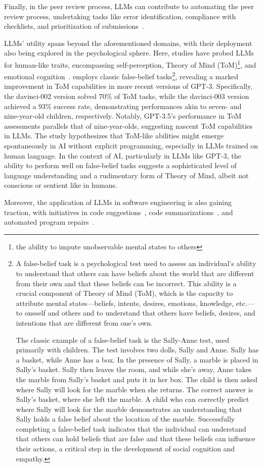 Finally, in the peer review process, LLMs can contribute to automating the peer review process, undertaking tasks like error identification, compliance with checklists, and prioritization of submissions~\cite{liu2023reviewergpt}.

LLMs' utility spans beyond the aforementioned domains, with their deployment also being explored in the psychological sphere.
Here, studies have probed LLMs for human-like traits, encompassing self-perception, Theory of Mind (ToM)\footnote{the ability to impute unobservable mental states to others}, and emotional cognition~\cite{kosinski2023theoryofmind, amin2023affectivecomputing}.
\textcite{kosinski2023theoryofmind} employs classic false-belief tasks\footnote{A false-belief task is a psychological test used to assess an individual's ability to understand that others can have beliefs about the world that are different from their own and that these beliefs can be incorrect. This ability is a crucial component of Theory of Mind (ToM), which is the capacity to attribute mental states—beliefs, intents, desires, emotions, knowledge, etc.—to oneself and others and to understand that others have beliefs, desires, and intentions that are different from one's own.

	The classic example of a false-belief task is the Sally-Anne test, used primarily with children. The test involves two dolls, Sally and Anne. Sally has a basket, while Anne has a box. In the presence of Sally, a marble is placed in Sally's basket. Sally then leaves the room, and while she's away, Anne takes the marble from Sally's basket and puts it in her box. The child is then asked where Sally will look for the marble when she returns. The correct answer is Sally's basket, where she left the marble. A child who can correctly predict where Sally will look for the marble demonstrates an understanding that Sally holds a false belief about the location of the marble.
	Successfully completing a false-belief task indicates that the individual can understand that others can hold beliefs that are false and that these beliefs can influence their actions, a critical step in the development of social cognition and empathy.}, revealing a marked improvement in ToM capabilities in more recent versions of GPT-3.
Specifically, the davinci-002 version solved 70\% of ToM tasks, while the davinci-003 version achieved a 93\% success rate, demonstrating performances akin to seven- and nine-year-old children, respectively.
Notably, GPT-3.5's performance in ToM assessments parallels that of nine-year-olds, suggesting nascent ToM capabilities in LLMs.
The study hypothesizes that ToM-like abilities might emerge spontaneously in AI without explicit programming, especially in LLMs trained on human language.
In the context of AI, particularly in LLMs like GPT-3, the ability to perform well on false-belief tasks suggests a sophisticated level of language understanding and a rudimentary form of Theory of Mind, albeit not conscious or sentient like in humans.

Moreover, the application of LLMs in software engineering is also gaining traction, with initiatives in code suggestions~\cite{sridhara2023chatgptsoftware}, code summarizations~\cite{sun2023code}, and automated program repairs~\cite{xia2023conversationalrepair}.
